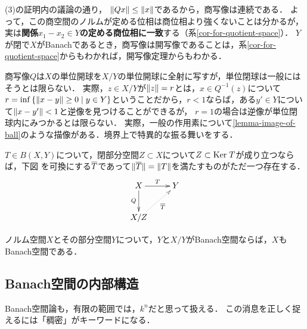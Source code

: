 \documentclass[uplatex,dvipdfmx]{jsreport}
\begin{document}
\begin{remark}
    (3)の証明内の議論の通り，
    $\|Qx\|\le\|x\|$であるから，商写像は連続である．
    よって，この商空間のノルムが定める位相は商位相より強くないことは分かるが，実は\textbf{関係$x_1-x_2\in Y$の定める商位相に一致}する（系\ref{cor-for-quotient-space}）．
    $Y$が閉で$X$がBanachであるとき，商写像は開写像であることは，系\ref{cor-for-quotient-space}からもわかれば，開写像定理からもわかる．
\end{remark}
\begin{remark}[連続延長の失敗]
    商写像$Q$は$X$の単位開球を$X/Y$の単位開球に全射に写すが，単位閉球は一般にはそうとは限らない．
    実際，$z\in X/Y$が$\|z\|=r$とは，$x\in Q^{-1}(z)$について$r=\inf\left\{\|x-y\|\ge 0\mid y\in Y\right\}$ということだから，$r<1$ならば，ある$y'\in Y$について$\|x-y'\|<1$と逆像を見つけることができるが，
    $r=1$の場合は逆像が単位閉球内にみつかるとは限らない．
    実際，一般の作用素について\ref{lemma-image-of-ball}のような描像がある．境界上で特異的な振る舞いをする．
\end{remark}

\begin{proposition}[商空間の普遍性]
    $T\in B(X,Y)$について，閉部分空間$Z\subset X$について$Z\subset\mathrm{Ker}\; T$が成り立つならば，下図
    を可換にする$\overline{T}$であって$\|\overline{T}\|=\|T\|$を満たすものがただ一つ存在する．
    \[\xymatrix{
        X\ar[r]^-T\ar[d]_-Q&Y\\
        X/Z\ar@{.>}[ur]_-{\o{T}}
    }\]
\end{proposition}

\begin{proposition}[Banach空間の標準分解]
    ノルム空間$X$とその部分空間$Y$について，$Y$と$X/Y$がBanach空間ならば，$X$もBanach空間である．
\end{proposition}

\subsection{Banach空間の内部構造}

\begin{tcolorbox}[colframe=ForestGreen, colback=ForestGreen!10!white,breakable,colbacktitle=ForestGreen!40!white,coltitle=black,fonttitle=\bfseries\sffamily,
title=連続線形延長の算譜]
    Banach空間論も，有限の範囲では，$k^n$だと思って扱える．
    この消息を正しく捉えるには「稠密」がキーワードになる．
\end{tcolorbox}
\end{document}
